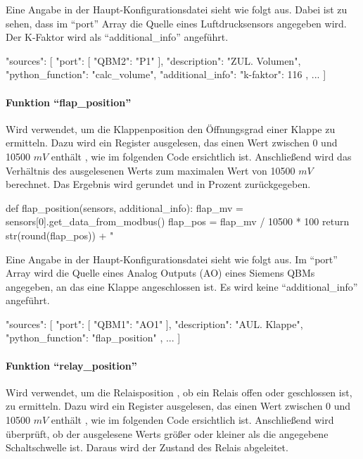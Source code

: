 Eine Angabe in der Haupt-Konfigurationsdatei sieht wie folgt aus. Dabei ist zu sehen, dass im \enquote{port} Array die Quelle eines Luftdrucksensors angegeben wird. Der K-Faktor wird als \enquote{additional\_info} angeführt.

\begin{jsoncode}
"sources": [
	{
		"port": [
			{"QBM2": "P1"}
		],
		"description": "ZUL. Volumen",
		"python_function": "calc_volume",
		"additional_info": {"k-faktor": 116}
	},
	...
]
\end{jsoncode}



\paragraph{Funktion \enquote{flap\_position}}
Wird verwendet, um die Klappenposition \bzw den Öffnungsgrad einer Klappe zu ermitteln. 
Dazu wird ein Register ausgelesen, das einen Wert zwischen 0 und 10500 $mV$ enthält \cite[vgl.][17]{siemens:2021}, wie im folgenden Code ersichtlich ist. Anschließend wird das Verhältnis des ausgelesenen Werts zum maximalen Wert von 10500 $mV$ berechnet. Das Ergebnis wird gerundet und in Prozent zurückgegeben.

\begin{pythoncode}
def flap_position(sensors, additional_info):
	flap_mv = sensors[0].get_data_from_modbus()
	flap_pos = flap_mv / 10500 * 100
	return str(round(flap_pos)) + " %
\end{pythoncode}

Eine Angabe in der Haupt-Konfigurationsdatei sieht wie folgt aus. Im \enquote{port} Array wird die Quelle eines Analog Outputs (AO) eines Siemens QBMs angegeben, an das eine Klappe angeschlossen ist. Es wird keine \enquote{additional\_info} angeführt.

\begin{jsoncode}
"sources": [
	{
		"port": [
			{"QBM1": "AO1"}
		],
		"description": "AUL. Klappe",
		"python_function": "flap_position"
	},
	...
]
\end{jsoncode}



\paragraph{Funktion \enquote{relay\_position}}
Wird verwendet, um die Relaisposition \bzw, ob ein Relais offen oder geschlossen ist, zu ermitteln. Dazu wird ein Register ausgelesen, das einen Wert zwischen 0 und 10500 $mV$ enthält \cite[vgl.][17]{siemens:2021}, wie im folgenden Code ersichtlich ist. Anschließend wird überprüft, ob der ausgelesene Werts größer oder kleiner als die angegebene Schaltschwelle ist. Daraus wird der Zustand des Relais abgeleitet.

